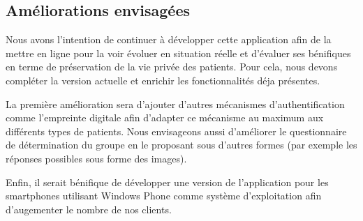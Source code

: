 \subsection{Améliorations envisagées}

Nous avons l’intention de continuer à développer cette application afin de la mettre en ligne pour la voir évoluer en situation réelle et d'évaluer ses bénifiques en terme de préservation de la vie privée des patients. Pour cela, nous devons compléter la version actuelle et enrichir les fonctionnalités déja présentes.

\vspace{6pt}
\paragraphmark

La première amélioration sera d’ajouter d'autres mécanismes d'authentification comme l'empreinte digitale afin d'adapter ce mécanisme au maximum aux différents types de patients. Nous envisageons aussi d’améliorer le questionnaire de détermination du groupe en le proposant sous d'autres formes (par exemple les réponses possibles sous forme des images).

\vspace{6pt}
\paragraphmark

Enfin, il serait bénifique de développer une version de l'application pour les smartphones utilisant Windows Phone comme système d'exploitation afin d'augementer le nombre de nos clients. 